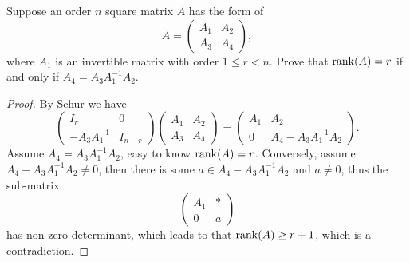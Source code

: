 \begin{pro}%
	Suppose an order $n$ square matrix $A$ has the form of
	\[A=\begin{pmatrix} A_1 & A_2\\ A_3 & A_4\end{pmatrix},\]
	where $A_1$ is an invertible matrix with order $1\leq r<n$. Prove that $\operatorname*{rank}(A)=r$ if and only if $A_4=A_3 A_1^{-1} A_2$.
\end{pro}
\begin{proof}
	By Schur we have
	\[\begin{pmatrix}I_r & 0\\ -A_3 A_1^{-1} & I_{n-r}\end{pmatrix}
	\begin{pmatrix} A_1 & A_2\\ A_3 & A_4\end{pmatrix}
	=\begin{pmatrix} A_1 & A_2\\ 0 & A_4-A_3 A_1^{-1} A_2\end{pmatrix}.\]
	Assume $A_4=A_3 A_1^{-1} A_2$, easy to know $\operatorname*{rank}(A)=r$. Conversely, assume $A_4-A_3 A_1^{-1} A_2\neq 0$, then
	there is some $a\in A_4-A_3 A_1^{-1} A_2$ and $a\neq 0$, thus the sub-matrix
	\[\begin{pmatrix} A_1 & *\\ 0 & a\end{pmatrix}\]
	has non-zero determinant, which leads to that $\operatorname*{rank}(A)\geq r+1$, which is a contradiction.
\end{proof}

